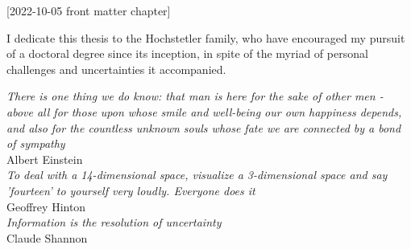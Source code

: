 [2022-10-05 front matter chapter]
%
%
%
%
%
%

%
%
%
\begin{statement}
\end{statement}

\begin{dedication}
I dedicate this thesis to the Hochstetler family, who have encouraged my pursuit of a doctoral degree since its inception, in spite of the myriad of personal challenges and uncertainties it accompanied.  

\vspace{1in}
\textit{There is one thing we do know: that man is here for the sake of other men - above all for those upon whose smile and well-being our own happiness depends, and also for the countless unknown souls whose fate we are connected by a bond of sympathy}\\
Albert Einstein\\
\vspace{1in}
\textit{To deal with a 14-dimensional space, visualize a 3-dimensional space and say 'fourteen' to yourself very loudly. Everyone does it}\\ Geoffrey Hinton \\
\vspace{1in}
\textit{Information is the resolution of uncertainty} \\Claude Shannon
\vspace{1in}



\end{dedication}

